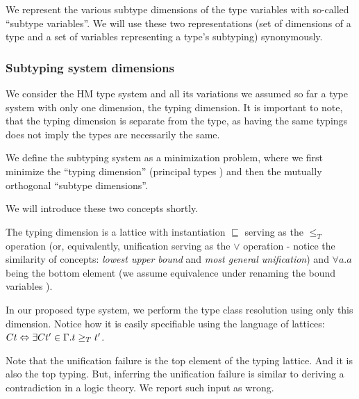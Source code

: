 We represent the various subtype dimensions of the type variables with so-called ``subtype variables''. We will use these two representations (set of dimensions of a type and a set of variables representing a type's subtyping) synonymously.

\subsubsection{Subtyping system dimensions}

\begin{remark}
    We consider the HM type system and all its variations we assumed so far a type system with only one dimension, the typing dimension. It is important to note, that the typing dimension is separate from the type, as having the same typings does not imply the types are necessarily the same.
\end{remark}

\begin{defn}
    We define the subtyping system as a minimization problem, where we first minimize the ``typing dimension'' (principal types ) and then the mutually orthogonal ``subtype dimensions''.

    We will introduce these two concepts shortly.
\end{defn}


\begin{defn}
    \label{typing_def}
    The typing dimension is a lattice with instantiation $\sqsubseteq$ serving as the $\leq_T$ operation (or, equivalently, unification serving as the $\lor$ operation - notice the similarity of concepts: \emph{lowest upper bound} and \emph{most general unification}) and $\forall a . a$ being the bottom element (we assume equivalence under renaming the bound variables ).

    In our proposed type system, we perform the type class resolution using only this dimension. Notice how it is easily specifiable using the language of lattices: $C t \Leftrightarrow \exists C t' \in \Gamma . t \geq_T t'$.
\end{defn}

\begin{remark}
    Note that the unification failure is the top element of the typing lattice. And it is also the top typing. But, inferring the unification failure is similar to deriving a contradiction in a logic theory. We report such input as wrong.
\end{remark}

